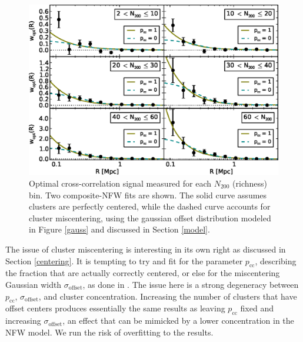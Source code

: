 \begin{figure}
\begin{center}
\includegraphics[scale=0.9]{plots_ch3/wopt_panel_fcc0and1_U.eps}
\caption[Magnification for Richness-Binned Clusters]{Optimal cross-correlation signal measured for each $N_{200}$ (richness) bin. Two composite-\ac{NFW} fits are shown. The solid curve assumes clusters are perfectly centered, while the dashed curve accounts for cluster miscentering, using the gaussian offset distribution modeled in Figure \ref{gauss} and discussed in Section \ref{model}.}
\label{binned}
\end{center}
\end{figure}

The issue of cluster miscentering is interesting in its own right as discussed in Section \ref{centering}. It is tempting to try and fit for the parameter $p_{\mathrm{cc}}$, describing the fraction that are actually correctly centered, or else for the miscentering Gaussian width $\sigma_{\mathrm{offset}}$, as done in \citet{Johnston07}. The issue here is a strong degeneracy between $p_{\mathrm{cc}}$, $\sigma_{\mathrm{offset}}$, and cluster concentration. Increasing the number of clusters that have offset centers produces essentially the same results as leaving $p_{\mathrm{cc}}$ fixed and increasing $\sigma_{\mathrm{offset}}$, an effect that can be mimicked by a lower concentration in the \ac{NFW} model. We run the risk of overfitting to the results. 

